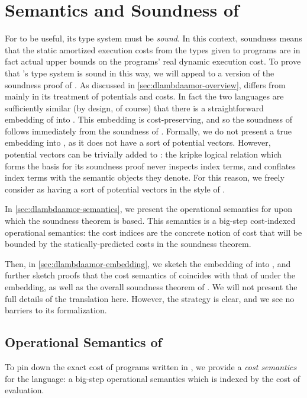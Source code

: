 \section{Semantics and Soundness of \dlambdaamor}
\label{sec:dlambdaamor-sound}
For \dlambdaamor to be useful, its type system must be \textit{sound}. In this context, soundness means that the static amortized execution costs from the types given to programs are in fact actual upper bounds on the programs' real dynamic execution cost. To prove that \dlambdaamor's type system is sound in this way, we will appeal to a version of the soundness proof of \lambdaamor. As discussed in \autoref{sec:dlambdaamor-overview}, \lambdaamor differs from \dlambdaamor mainly in its treatment of potentials and costs. In fact the two languages are sufficiently similar (by design, of course) that there is a straightforward embedding of \dlambdaamor into \lambdaamor. This embedding is cost-preserving, and so the soundness of \dlambdaamor follows immediately from the soundness of \lambdaamor. Formally, we do not present a true embedding into \lambdaamor, as it does not have a sort of potential vectors. However, potential vectors can be trivially added to \lambdaamor: the kripke logical relation which forms the basis for its soundness proof never inspects index terms, and conflates index terms with the semantic objects they denote. For this reason, we freely consider \lambdaamor as having a sort of potential vectors in the style of \dlambdaamor.

In \autoref{sec:dlambdaamor-semantics}, we present the operational semantics for \dlambdaamor upon which the soundness theorem is based. This semantics is a big-step cost-indexed operational semantics: the cost indices are the concrete notion of cost that will be bounded by the statically-predicted costs in the soundness theorem.

Then, in \autoref{sec:dlambdaamor-embedding}, we sketch the embedding of \dlambdaamor into \lambdaamor, and further sketch proofs that the cost semantics of \dlambdaamor coincides with that of \lambdaamor under the embedding, as well as the overall soundness theorem of \dlambdaamor. We will not present the full details of the translation here. However, the strategy is clear, and we see no barriers to its formalization.


\subsection{Operational Semantics of \dlambdaamor}
\label{sec:dlambdaamor-semantics}
To pin down the exact cost of programs written in \dlambdaamor, we provide a \textit{cost semantics} for the language: a big-step operational semantics which is indexed by the cost of evaluation.

